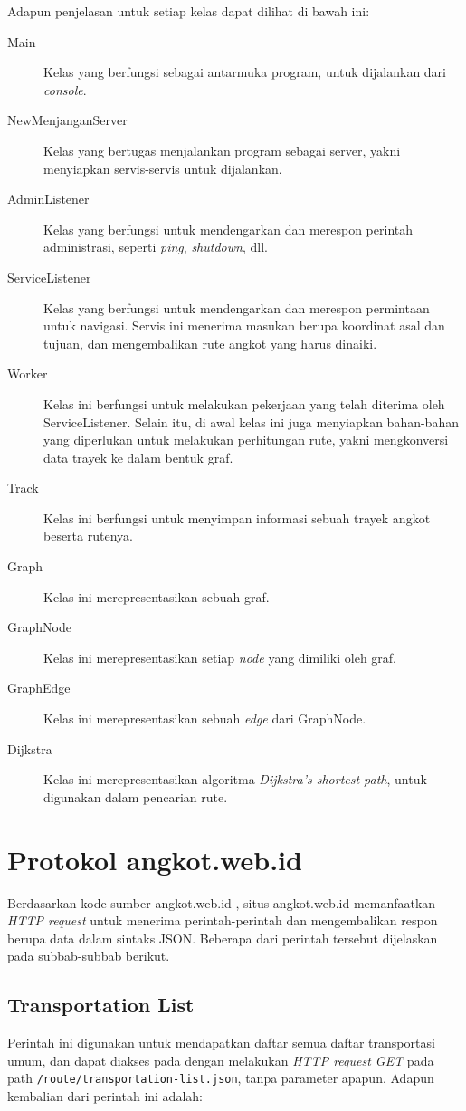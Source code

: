 Adapun penjelasan untuk setiap kelas dapat dilihat di bawah ini:

\begin{description}
	\item[Main] Kelas yang berfungsi sebagai antarmuka program, untuk dijalankan dari \textit{console}.
	\item[NewMenjanganServer] Kelas yang bertugas menjalankan program sebagai server, yakni menyiapkan servis-servis untuk dijalankan.
	\item[AdminListener] Kelas yang berfungsi untuk mendengarkan dan merespon perintah administrasi, seperti \textit{ping}, \textit{shutdown}, dll.
	\item[ServiceListener] Kelas yang berfungsi untuk mendengarkan dan merespon permintaan untuk navigasi. Servis ini menerima masukan berupa koordinat asal dan tujuan, dan mengembalikan rute angkot yang harus dinaiki.
	\item[Worker] Kelas ini berfungsi untuk melakukan pekerjaan yang telah diterima oleh ServiceListener. Selain itu, di awal kelas ini juga menyiapkan bahan-bahan yang diperlukan untuk melakukan perhitungan rute, yakni mengkonversi data trayek ke dalam bentuk graf.
	\item[Track] Kelas ini berfungsi untuk menyimpan informasi sebuah trayek angkot beserta rutenya.
	\item[Graph] Kelas ini merepresentasikan sebuah graf.
	\item[GraphNode] Kelas ini merepresentasikan setiap \textit{node} yang dimiliki oleh graf.
	\item[GraphEdge] Kelas ini merepresentasikan sebuah \textit{edge} dari GraphNode.
	\item[Dijkstra] Kelas ini merepresentasikan algoritma \textit{Dijkstra's shortest path}\cite{Cormen:2001}, untuk digunakan dalam pencarian rute.
\end{description}

\section{Protokol angkot.web.id}
\label{sec:protokol_angkot_web_id}

Berdasarkan kode sumber angkot.web.id \cite{angkotwebid}, situs angkot.web.id memanfaatkan \textit{HTTP request} \cite{rfc7231} untuk menerima perintah-perintah dan mengembalikan respon berupa data dalam sintaks JSON. Beberapa dari perintah tersebut dijelaskan pada subbab-subbab berikut.

\subsection{Transportation List}
Perintah ini digunakan untuk mendapatkan daftar semua daftar transportasi umum, dan dapat diakses pada dengan melakukan \textit{HTTP request GET} pada path \texttt{/route/transportation-list.json}, tanpa parameter apapun. Adapun kembalian dari perintah ini adalah:

